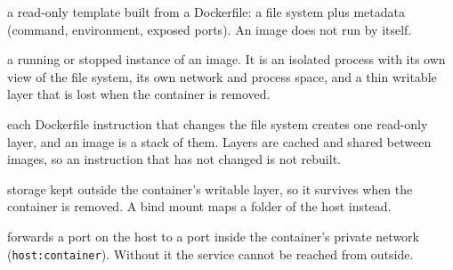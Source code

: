 \begin{description}[leftmargin=2.6cm,style=nextline]
\item[Image] a read-only template built from a Dockerfile: a file system plus metadata (command,
environment, exposed ports). An image does not run by itself.
\item[Container] a running or stopped instance of an image. It is an isolated process with its own
view of the file system, its own network and process space, and a thin writable layer that is lost
when the container is removed.
\item[Layer] each Dockerfile instruction that changes the file system creates one read-only layer,
and an image is a stack of them. Layers are cached and shared between images, so an instruction
that has not changed is not rebuilt.
\item[Volume] storage kept outside the container's writable layer, so it survives when the
container is removed. A bind mount maps a folder of the host instead.
\item[Port mapping] forwards a port on the host to a port inside the container's private network
(\texttt{host:container}). Without it the service cannot be reached from outside.
\end{description}

